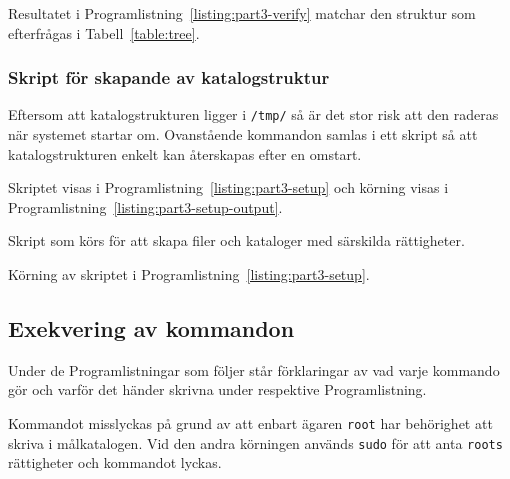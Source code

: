 Resultatet i Programlistning~\ref{listing:part3-verify} matchar den
struktur som efterfrågas i Tabell~\ref{table:tree}.


\subsubsection{Skript för skapande av katalogstruktur}
Eftersom att katalogstrukturen ligger i \texttt{/tmp/} så är det stor risk att
den raderas när systemet startar om. Ovanstående kommandon samlas i ett skript
så att katalogstrukturen enkelt kan återskapas efter en omstart.

Skriptet visas i Programlistning~\ref{listing:part3-setup} och körning visas i
Programlistning~\ref{listing:part3-setup-output}.

\begin{listing}[H]
\caption[Skript för att skapa katalogstruktur]{Skript som körs för att skapa
         filer och kataloger med särskilda rättigheter.}
\label{listing:part3-setup}
\end{listing}

\begin{listing}[H]
\caption{Körning av skriptet i Programlistning~\ref{listing:part3-setup}.}
\label{listing:part3-setup-output}
\end{listing}


\subsection{Exekvering av kommandon}
%
%

\newcommand{\explainedcmd}[4]{
\begin{listing}[H]
\shellcode[firstline={#1},lastline={#2}]{tex/part3-commands}
\caption[#3]{#4}
\label{listing:ntp-conf-mod}
\end{listing}
}

Under de Programlistningar som följer står förklaringar av vad varje kommando
gör och varför det händer skrivna under respektive Programlistning.

\explainedcmd{1}{3}
             {Kommandot \texttt{touch /tmp/del3/a1/f1}}
             {Kommandot misslyckas på grund av att enbart ägaren \texttt{root}
              har behörighet att skriva i målkatalogen.  
              Vid den andra körningen används \texttt{sudo} för att anta 
              \texttt{roots} rättigheter och kommandot lyckas.}

